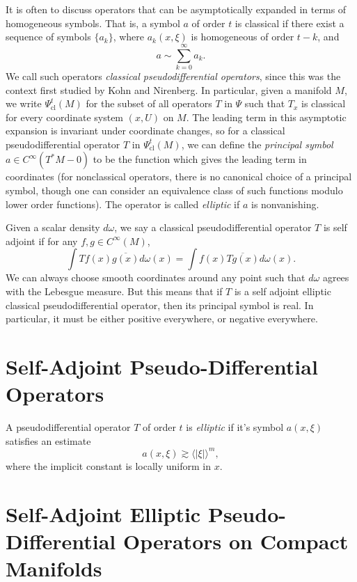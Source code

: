 It is often to discuss operators that can be asymptotically expanded in terms of homogeneous symbols. That is, a symbol $a$ of order $t$ is classical if there exist a sequence of symbols $\{ a_k \}$, where $a_k(x,\xi)$ is homogeneous of order $t - k$, and
%
\[ a \sim \sum_{k = 0}^\infty a_k. \]
%
We call such operators \emph{classical pseudodifferential operators}, since this was the context first studied by Kohn and Nirenberg. In particular, given a manifold $M$, we write $\Psi_{\text{cl}}^t(M)$ for the subset of all operators $T$ in $\Psi$ such that $T_x$ is classical for every coordinate system $(x,U)$ on $M$. The leading term in this asymptotic expansion is invariant under coordinate changes, so for a classical pseudodifferential operator $T$ in $\Psi_{\text{cl}}^t(M)$, we can define the \emph{principal symbol} $a \in C^\infty(T^* M - 0)$ to be the function which gives the leading term in coordinates (for nonclassical operators, there is no canonical choice of a principal symbol, though one can consider an equivalence class of such functions modulo lower order functions). The operator is called \emph{elliptic} if $a$ is nonvanishing.

Given a scalar density $d\omega$, we say a classical pseudodifferential operator $T$ is self adjoint if for any $f,g \in C^\infty(M)$,
%
\[ \int Tf(x) \overline{g(x)} d\omega(x) = \int f(x) \overline{Tg(x)} d\omega(x). \]
%
We can always choose smooth coordinates around any point such that $d\omega$ agrees with the Lebesgue measure. But this means that if $T$ is a self adjoint elliptic classical pseudodifferential operator, then its principal symbol is real. In particular, it must be either positive everywhere, or negative everywhere.




\section{Self-Adjoint Pseudo-Differential Operators}

A pseudodifferential operator $T$ of order $t$ is \emph{elliptic} if it's symbol $a(x,\xi)$ satisfies an estimate
%
\[ a(x,\xi) \gtrsim \langle |\xi| \rangle^m, \]
%
where the implicit constant is locally uniform in $x$.









\section{Self-Adjoint Elliptic Pseudo-Differential Operators on Compact Manifolds}

